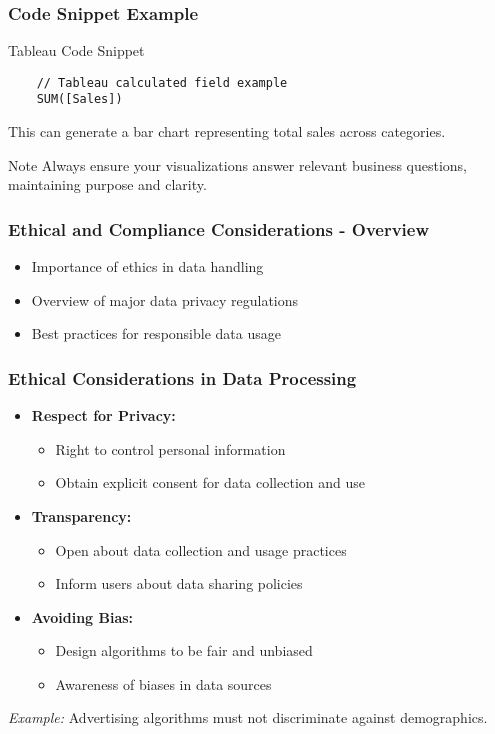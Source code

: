 \documentclass[aspectratio=169]{beamer}
\begin{document}
\begin{frame}[fragile]
    \frametitle{Code Snippet Example}
    \begin{block}{Tableau Code Snippet}
    \begin{lstlisting}
    // Tableau calculated field example 
    SUM([Sales]) 
    \end{lstlisting}
    This can generate a bar chart representing total sales across categories.
    \end{block}
    
    \begin{block}{Note}
        Always ensure your visualizations answer relevant business questions, maintaining purpose and clarity.
    \end{block}
\end{frame}

\begin{frame}[fragile]
    \frametitle{Ethical and Compliance Considerations - Overview}
    \begin{itemize}
        \item Importance of ethics in data handling
        \item Overview of major data privacy regulations
        \item Best practices for responsible data usage
    \end{itemize}
\end{frame}

\begin{frame}[fragile]
    \frametitle{Ethical Considerations in Data Processing}
    \begin{itemize}
        \item \textbf{Respect for Privacy:} 
            \begin{itemize}
                \item Right to control personal information
                \item Obtain explicit consent for data collection and use
            \end{itemize}
        \item \textbf{Transparency:} 
            \begin{itemize}
                \item Open about data collection and usage practices
                \item Inform users about data sharing policies
            \end{itemize}
        \item \textbf{Avoiding Bias:}
            \begin{itemize}
                \item Design algorithms to be fair and unbiased
                \item Awareness of biases in data sources
            \end{itemize}
    \end{itemize}
    \vspace{0.5cm}
    \textit{Example:} Advertising algorithms must not discriminate against demographics.
\end{frame}
\end{document}
